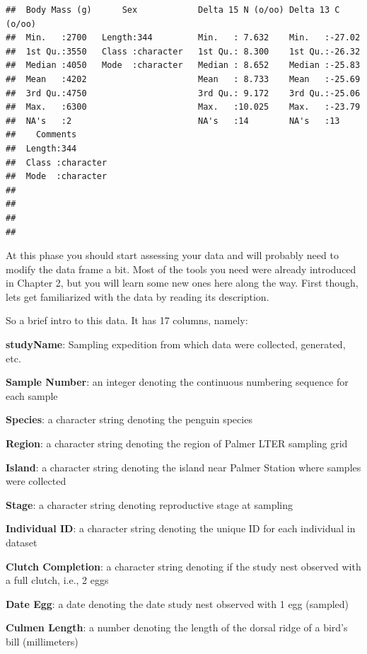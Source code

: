 \documentclass[
]{book}
\begin{document}
\begin{verbatim}
##  Body Mass (g)      Sex            Delta 15 N (o/oo) Delta 13 C (o/oo)
##  Min.   :2700   Length:344         Min.   : 7.632    Min.   :-27.02   
##  1st Qu.:3550   Class :character   1st Qu.: 8.300    1st Qu.:-26.32   
##  Median :4050   Mode  :character   Median : 8.652    Median :-25.83   
##  Mean   :4202                      Mean   : 8.733    Mean   :-25.69   
##  3rd Qu.:4750                      3rd Qu.: 9.172    3rd Qu.:-25.06   
##  Max.   :6300                      Max.   :10.025    Max.   :-23.79   
##  NA's   :2                         NA's   :14        NA's   :13       
##    Comments        
##  Length:344        
##  Class :character  
##  Mode  :character  
##                    
##                    
##                    
## 
\end{verbatim}

At this phase you should start assessing your data and will probably need to modify the data frame a bit.
Most of the tools you need were already introduced in Chapter 2, but you will learn some new ones here along the way.
First though, lets get familiarized with the data by reading its description.

So a brief intro to this data.
It has 17 columns, namely:

\textbf{studyName}: Sampling expedition from which data were collected, generated, etc.

\textbf{Sample Number}: an integer denoting the continuous numbering sequence for each sample

\textbf{Species}: a character string denoting the penguin species

\textbf{Region}: a character string denoting the region of Palmer LTER sampling grid

\textbf{Island}: a character string denoting the island near Palmer Station where samples were collected

\textbf{Stage}: a character string denoting reproductive stage at sampling

\textbf{Individual ID}: a character string denoting the unique ID for each individual in dataset

\textbf{Clutch Completion}: a character string denoting if the study nest observed with a full clutch, i.e., 2 eggs

\textbf{Date Egg}: a date denoting the date study nest observed with 1 egg (sampled)

\textbf{Culmen Length}: a number denoting the length of the dorsal ridge of a bird's bill (millimeters)
\end{document}
